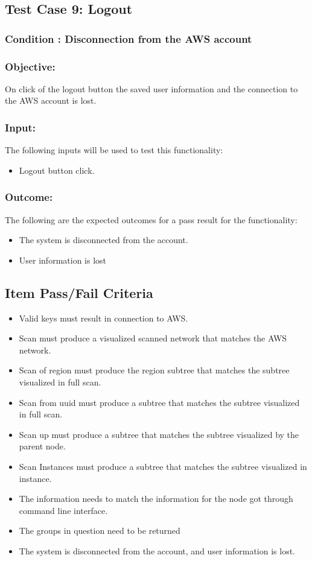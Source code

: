 \documentclass[hidelinks,a4paper,12pt]{article}
\begin{document}
\subsection{Test Case 9: Logout }
\subsubsection{Condition : Disconnection from the AWS account}
\subsubsection{Objective:} On click of the logout button the saved user information and the connection to the AWS account is lost. 

\subsubsection{Input:}
The following inputs will be used to test this functionality:
\begin{itemize}
	\item Logout button click.
	
	
\end{itemize}

\subsubsection{Outcome: }
The following are the expected outcomes for a pass result for the functionality:
\begin{itemize}
	\item The system is disconnected from the account.
	\item User information is lost
	
\end{itemize}

\subsection{Item Pass/Fail Criteria}

\begin{itemize}
\item Valid keys must result in connection to AWS.
\item Scan must produce a visualized scanned network that matches the AWS network.
\item Scan of region must produce the region subtree that matches the subtree visualized in full scan.
\item Scan from uuid must produce a  subtree that matches the subtree visualized in full scan.
\item Scan up must produce a subtree that matches the subtree visualized by the parent node.
\item Scan Instances must produce a subtree that matches the subtree visualized in instance.
\item The information needs to match the information for the node got through command line interface.
\item The groups in question need to be returned
\item The system is disconnected from the account, and user information is lost. 
\end{itemize}
\newpage
\end{document}
